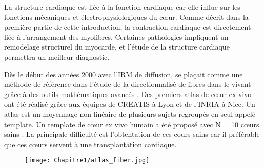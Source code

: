 La structure cardiaque est liée à la fonction cardiaque car elle influe sur les fonctions mécaniques et électrophysiologiques du cœur. Comme décrit dans la première partie de cette introduction, la contraction cardiaque est directement liée à l’arrangement des myofibres.  Certaines pathologies impliquent un remodelage structurel du myocarde, et l’étude de la structure cardiaque permettra un meilleur diagnostic.

Dès le début des années 2000 avec l’IRM de diffusion, se plaçait comme une méthode de référence dans l’étude de la directionnalisé de fibres dans le vivant grâce à des outils mathématiques avancés \cite{Basser1994}. Des premiers atlas de cœur ex vivo ont été réalisé grâce aux équipes de CREATIS à Lyon et de l’INRIA à Nice. Un atlas est un moyennage non linéaire de plusieurs sujets regroupés en seul appelé template. Un template de cœur ex vivo humain a été proposé avec N = 10 cœurs sains \cite{Lombaert2012}. La principale difficulté est l’obtentation de ces cours sains car il préférable que ces cœurs servent à une transplantation cardiaque.
\begin{figure}[!h]
\begin{center}
  \texttt{[image: Chapitre1/atlas\_fiber.jpg]}
   \end{center}
  \caption{}
\label{fig:atlas}
\end{figure}


